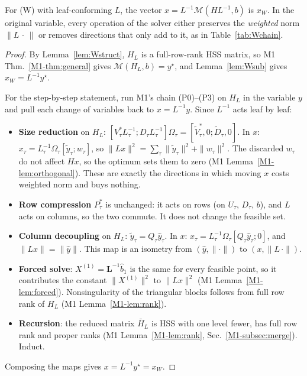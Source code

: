\begin{theorem}\label{thm:W}
For (W) with leaf-conforming $L$, the vector $x=L^{-1}\mathcal M(HL^{-1},b)$ is $x_W$. In the
original variable, every operation of the solver either preserves the \emph{weighted} norm
$\|L\,\cdot\,\|$ or removes directions that only add to it, as in Table~\ref{tab:Wchain}.
\end{theorem}
\begin{proof}
By Lemma~\ref{lem:Wstruct}, $H_L$ is a full-row-rank HSS matrix, so M1 Thm.~\ref{M1-thm:general} gives
$\mathcal M(H_L,b)=y^\star$, and Lemma~\ref{lem:Wsub} gives $x_W=L^{-1}y^\star$.

For the step-by-step statement, run M1's chain (P0)--(P3) on $H_L$ in the variable $y$ and pull
each change of variables back to $x=L^{-1}y$. Since $L^{-1}$ acts leaf by leaf:
\begin{itemize}[leftmargin=1.4em,itemsep=2pt]
\item \textbf{Size reduction} on $H_L$: $[V_\tau^*L_\tau^{-1};D_\tau L_\tau^{-1}]\Omega_\tau=[\tilde V_\tau^*,0;\tilde D_\tau,0]$.
In $x$: $x_\tau=L_\tau^{-1}\Omega_\tau[\tilde y_\tau;w_\tau]$, so
$\|Lx\|^2=\sum_\tau\|\tilde y_\tau\|^2+\|w_\tau\|^2$. The discarded $w_\tau$ do not affect $Hx$, so the
optimum sets them to zero (M1 Lemma~\ref{M1-lem:orthogonal}). These are exactly the directions in which moving $x$
costs weighted norm and buys nothing.
\item \textbf{Row compression} $P_\tau^*$ is unchanged: it acts on rows (on $U_\tau$, $D_\tau$, $b$),
and $L$ acts on columns, so the two commute. It does not change the feasible set.
\item \textbf{Column decoupling} on $H_L$: $\tilde y_\tau=Q_\tau\hat y_\tau$. In $x$:
$x_\tau=L_\tau^{-1}\Omega_\tau[Q_\tau\hat y_\tau;0]$, and $\|Lx\|=\|\hat y\|$. This map is an isometry
from $(\hat y,\|\cdot\|)$ to $(x,\|L\,\cdot\|)$.
\item \textbf{Forced solve}: $X^{(1)}=\mathbf L^{-1}\hat b_1$ is the same for every feasible point, so it
contributes the constant $\|X^{(1)}\|^2$ to $\|Lx\|^2$ (M1 Lemma~\ref{M1-lem:forced}). Nonsingularity of the
triangular blocks follows from full row rank of $H_L$ (M1 Lemma~\ref{M1-lem:rank}).
\item \textbf{Recursion}: the reduced matrix $\bar H_L$ is HSS with one level fewer, has full row rank
and proper ranks (M1 Lemma~\ref{M1-lem:rank}, Sec.~\ref{M1-subsec:merge}). Induct.
\end{itemize}
Composing the maps gives $x=L^{-1}y^\star=x_W$.
\end{proof}

